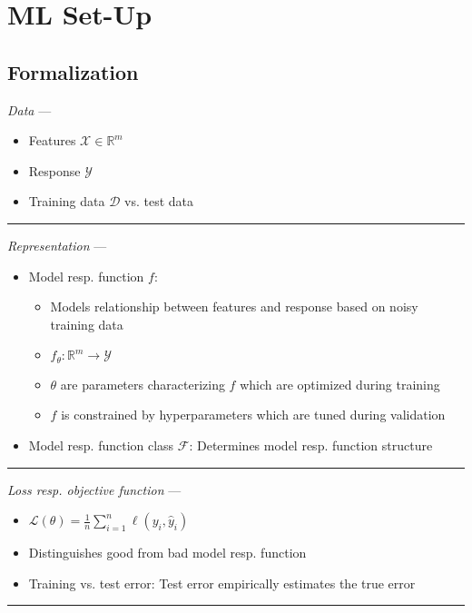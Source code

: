 \section{ML Set-Up}
\subsection*{Formalization}
\emph{Data} --- 
\begin{itemize}
    \item Features $\mathcal{X} \in \mathbb{R}^m$
    \item Response $\mathcal{Y}$
    \item Training data $\mathcal{D}$ vs. test data 
\end{itemize}

{\color{lightgray}\hrule height 0.001mm}

\emph{Representation} --- 
\begin{itemize}
    \item Model resp. function $f$: 
    \begin{itemize}
        \item Models relationship between features and response based on noisy training data
        \item $f_\theta : \mathbb{R}^m \rightarrow \mathcal{Y}$
        \item $\theta$ are parameters characterizing $f$ which are optimized during training
        \item $f$ is constrained by hyperparameters which are tuned during validation
    \end{itemize}
    \item Model resp. function class $\mathcal{F}$: Determines model resp. function structure
\end{itemize}

{\color{lightgray}\hrule height 0.001mm}

\emph{Loss resp. objective function} --- 
\begin{itemize}
    \item $\mathcal{L}(\theta) = \frac{1}{n} \sum_{i=1}^n \ell(y_i,\hat{y}_i)$
    \item Distinguishes good from bad model resp. function
    \item Training vs. test error: Test error empirically estimates the true error
\end{itemize}

{\color{lightgray}\hrule height 0.001mm}

